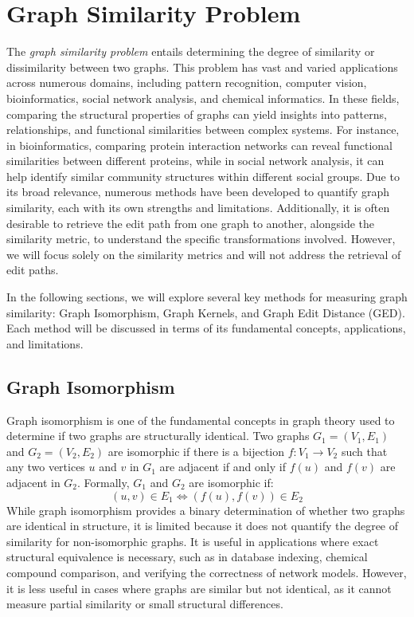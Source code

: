 \documentclass[../Thesis.tex]{subfiles}
\begin{document}
	
	\section{Graph Similarity Problem}
	\label{sec:graph_similarity_problem}
	
	The \emph{graph similarity problem} entails determining the degree of similarity or dissimilarity between two graphs. This problem has vast and varied applications across numerous domains, including pattern recognition, computer vision, bioinformatics, social network analysis, and chemical informatics. In these fields, comparing the structural properties of graphs can yield insights into patterns, relationships, and functional similarities between complex systems. For instance, in bioinformatics, comparing protein interaction networks can reveal functional similarities between different proteins, while in social network analysis, it can help identify similar community structures within different social groups. Due to its broad relevance, numerous methods have been developed to quantify graph similarity, each with its own strengths and limitations. Additionally, it is often desirable to retrieve the edit path from one graph to another, alongside the similarity metric, to understand the specific transformations involved. However, we will focus solely on the similarity metrics and will not address the retrieval of edit paths.
	
	In the following sections, we will explore several key methods for measuring graph similarity: Graph Isomorphism, Graph Kernels, and Graph Edit Distance (GED). Each method will be discussed in terms of its fundamental concepts, applications, and limitations.
	
	\subsection{Graph Isomorphism}
	
	Graph isomorphism is one of the fundamental concepts in graph theory used to determine if two graphs are structurally identical. Two graphs $G_1 = (V_1, E_1)$ and $G_2 = (V_2, E_2)$ are isomorphic if there is a bijection $f: V_1 \to V_2$ such that any two vertices $u$ and $v$ in $G_1$ are adjacent if and only if $f(u)$ and $f(v)$ are adjacent in $G_2$. Formally, $G_1$ and $G_2$ are isomorphic if:
	\[
	(u, v) \in E_1 \Leftrightarrow (f(u), f(v)) \in E_2
	\]
	While graph isomorphism provides a binary determination of whether two graphs are identical in structure, it is limited because it does not quantify the degree of similarity for non-isomorphic graphs. It is useful in applications where exact structural equivalence is necessary, such as in database indexing, chemical compound comparison, and verifying the correctness of network models. However, it is less useful in cases where graphs are similar but not identical, as it cannot measure partial similarity or small structural differences.
\end{document}
